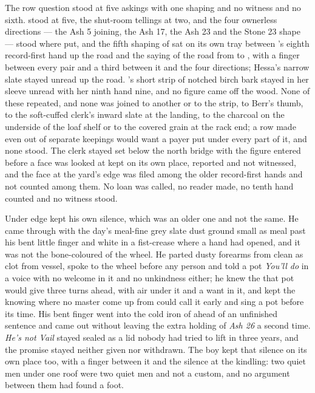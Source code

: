 The row question stood at five askings with one shaping and no witness and no sixth.  stood at five, the shut-room tellings at two, and the four ownerless directions --- the Ash 5 joining, the Ash 17, the Ash 23 and the Stone 23 shape --- stood where put, and the fifth shaping of  sat on its own tray between 's eighth record-first hand up the road and the saying of the road from  to , with a finger between every pair and a third between it and the four directions; Hessa's narrow slate stayed unread up the road. 's short strip of notched birch bark stayed in her sleeve unread with her ninth hand nine, and no figure came off the wood. None of these repeated, and none was joined to another or to the strip, to Berr's thumb, to the soft-cuffed clerk's inward slate at the landing, to the charcoal on the underside of the loaf shelf or to the covered grain at the rack end; a row made even out of separate keepings would want a payer put under every part of it, and none stood. The clerk stayed set below the north bridge with the figure entered before a face was looked at kept on its own place, reported and not witnessed, and the face at the yard's edge was filed among the older record-first hands and not counted among them. No loan was called, no reader made, no tenth hand counted and no witness stood.

Under  edge  kept his own silence, which was an older one and not the same. He came through  with the day's meal-fine grey slate dust ground small as meal past his bent little finger and white in a fist-crease where a hand had opened, and it was not the bone-coloured  of the wheel. He parted dusty forearms from clean as clot from vessel, spoke to the wheel before any person and told a pot \emph{You'll do} in a voice with no welcome in it and no unkindness either; he knew the  that pot would give three turns ahead, with air under it and a want in it, and kept the knowing where no master come up from  could call it early and sing a pot before its time. His bent finger went into the cold iron of  ahead of an unfinished sentence and came out without leaving the extra holding of \emph{Ash 26} a second time. \emph{He's not Vail} stayed sealed as a lid nobody had tried to lift in three years, and the promise stayed neither given nor withdrawn. The boy kept that silence on its own place too, with a finger between it and the silence at the kindling: two quiet men under one roof were two quiet men and not a custom, and no argument between them had found a foot.

